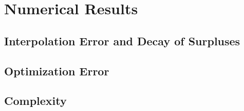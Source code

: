 \section{Numerical Results}
\label{sec:53results}

\blindtext{}



\subsection{Interpolation Error and Decay of Surpluses}

\blindtext{}



\subsection{Optimization Error}

\blindtext{}



\subsection{Complexity}

\blindtext{}
